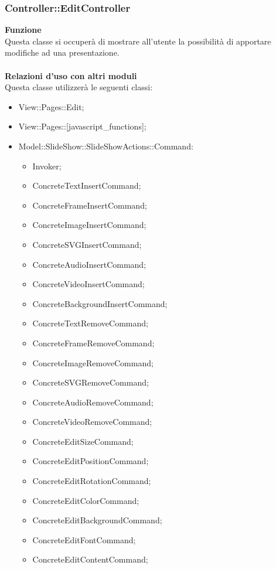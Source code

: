 {	\subsubsection{Controller::\-EditController}{
		\textbf{Funzione}\\
		\indent Questa classe si occuperà di mostrare all'utente la possibilità di apportare modifiche ad una presentazione.\\\\
		\textbf{Relazioni d'uso con altri moduli}\\
		\indent Questa classe utilizzerà le seguenti classi:
		\begin{itemize}
			\item View::\-Pages::\-Edit;
			\item View::Pages::[javascript\_functions];
			\item Model::\-SlideShow::\-SlideShowActions::\-Command:
			\begin{itemize}
				\item Invoker;
				\item ConcreteTextInsertCommand;
				\item ConcreteFrameInsertCommand;
				\item ConcreteImageInsertCommand;
				\item ConcreteSVGInsertCommand;
				\item ConcreteAudioInsertCommand;
				\item ConcreteVideoInsertCommand;
				\item ConcreteBackgroundInsertCommand;
				\item ConcreteTextRemoveCommand;
				\item ConcreteFrameRemoveCommand;
				\item ConcreteImageRemoveCommand;
				\item ConcreteSVGRemoveCommand;
				\item ConcreteAudioRemoveCommand;
				\item ConcreteVideoRemoveCommand;
				\item ConcreteEditSizeCommand;
				\item ConcreteEditPositionCommand;
				\item ConcreteEditRotationCommand;
				\item ConcreteEditColorCommand;
				\item ConcreteEditBackgroundCommand;
				\item ConcreteEditFontCommand;
				\item ConcreteEditContentCommand;

\end{itemize}
\end{itemize}}}

